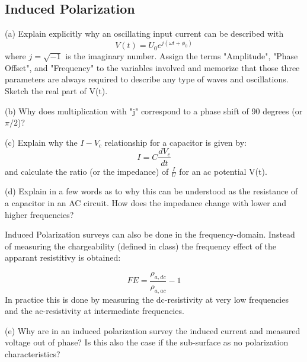 \subsection{Induced Polarization}
(a) Explain explicitly why an oscillating input current can be described with 
$$
V(t) = U_0e^{j(\omega t+\phi_0)}
$$ 
where $j=\sqrt{-1}$ is the imaginary number. Assign the terms "Amplitude", "Phase Offset", and "Frequency" to the variables involved and memorize that those three parameters are always required to describe any type of waves and oscillations. Sketch the real part of V(t).

(b) Why does multiplication with "j" correspond to a phase shift of 90 degrees (or $\pi/2$)? 

(c) Explain why the $I-V_c$ relationship for a capacitor is given by:
$$
I = C\frac{dV_c}{dt}
$$
and calculate the ratio (or the impedance) of $\frac{I}{U}$ for an ac potential V(t). 

(d) Explain in a few words as to why this can be understood as the resistance of a capacitor in an AC circuit. How does the impedance change with lower and higher frequencies? 

Induced Polarization surveys can also be done in the frequency-domain. Instead of measuring the chargeability (defined in class) the frequency effect of the apparant resistitivy is obtained:

$$
FE = \frac{\rho_{a,dc}}{\rho_{a,ac}} - 1
$$
In practice this is done by measuring the dc-resistivity at very low frequencies and the ac-resistivity at intermediate frequencies. 

(e) Why are in an induced polarization survey the induced current and measured voltage out of phase? Is this also the case if the sub-surface as no polarization characteristics?


